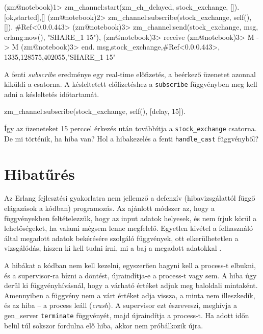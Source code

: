 \documentclass[12pt, a4paper, oneside]{book}
\begin{document}
\begin{code}{}{}
(zm@notebook)1> zm_channel:start(zm_ch_delayed, 
                                 stock_exchange, []).
{[{ok,started}],[]}
(zm@notebook)2> zm_channel:subscribe(stock_exchange, 
                                     self(), []).   
#Ref<0.0.0.443>
(zm@notebook)3> zm_channel:send(stock_exchange, 
                      {msg, {erlang:now(), "SHARE_1 15"}}),
(zm@notebook)3> receive
(zm@notebook)3> M -> M
(zm@notebook)3> end.
{msg,{stock_exchange,#Ref<0.0.0.443>},
     {{1335,128575,402055},"SHARE_1 15"}}
\end{code}

A fenti \emph{subscribe} eredménye egy real-time előfizetés, a beérkező
üzenetet azonnal kiküldi a csatorna. A késleltetett előfizetéshez a
\texttt{subscribe} függvényben meg kell adni a késleltetés időtartamát.

\begin{code}{}{}
zm_channel:subscribe(stock_exchange, self(), [{delay, 15}]).
\end{code}

Így az üzeneteket 15 perccel érkezés után továbbítja a \texttt{stock\_exchange}
csatorna. De mi történik, ha hiba van? Hol a hibakezelés a fenti
\texttt{handle\_cast} függvényből?

\section{Hibatűrés}
Az Erlang fejlesztési gyakorlatra nem jellemző a defenzív (hibavizsgálattól
függő elágazások a kódban) programozás. Az ajánlott módszer az, hogy a
függvényekben feltételezzük, hogy az input adatok helyesek, és nem írjuk körül
a lehetőségeket, ha valami mégsem lenne megfelelő. Egyetlen kivétel a
felhasználó által megadott adatok bekérésére szolgáló függvények, ott
elkerülhetetlen a vizsgálódás, hiszen ki kell tudni írni, mi a baj a megadott
adatokkal \citep{ArmstrongThesis}.

A hibákat a kódban nem kell kezelni, egyszerűen hagyni kell a process-t
elbukni, és a supervisor-ra bízni a döntést, újraindítja-e a process-t vagy
sem. A hiba úgy derül ki függvényhívásnál, hogy a várható értéket adjuk meg
baloldali mintaként. Amennyiben a függvény nem a várt értéket adja vissza, a
minta nem illeszkedik, és az hiba -- a process leáll (\emph{crash}). A
supervisor ezt észreveszi, meghívja a gen\_server \texttt{terminate}
függvényét, majd újraindítja a process-t. Ha adott időn belül túl sokszor
fordulna elő hiba, akkor nem próbálkozik újra.
\end{document}
